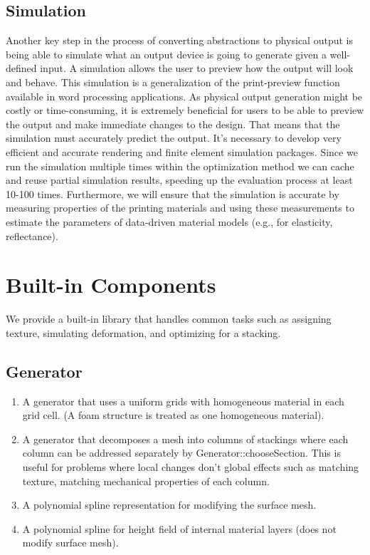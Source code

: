 \documentclass[annual]{acmsiggraph}
\begin{document}
\subsection{Simulation}
Another key step in the process of converting abstractions to physical output is being able to
simulate what an output device is going to generate given a well-defined input. 
A simulation allows the user to preview how the output will look and behave. 
This simulation is a generalization of the print-preview function
available in word processing applications.
As physical output generation might be costly or time-consuming, 
it is extremely beneficial for users to be able to preview the output and make immediate changes to the design.
That means that the simulation must accurately predict the output. 
It's necessary to develop very efficient and accurate rendering
and finite element simulation packages. Since we run the simulation multiple times within the optimization method
we can cache and reuse partial simulation results, speeding up the evaluation process at least 10-100 times.
Furthermore, we will ensure that the simulation is accurate by measuring properties of the printing materials and using
these measurements to estimate the parameters of data-driven material models (e.g., for elasticity, reflectance).

\section{Built-in Components}
We provide a built-in library that handles common tasks such as assigning texture,
simulating deformation, and optimizing for a stacking.
\subsection{Generator}
\begin{enumerate}
\item A generator that uses a uniform grids with homogeneous
material in each grid cell. (A foam structure is treated as one homogeneous material).
\item A generator that decomposes a mesh into columns of stackings where each
column can be addressed separately by Generator::chooseSection.
This is useful for problems where local changes don't global effects such as
matching texture, matching mechanical properties of each column.
\item A polynomial spline representation for modifying the surface mesh.
\item A polynomial spline for height field of internal material layers (does not modify
surface mesh).
\end{enumerate}
\end{document}
